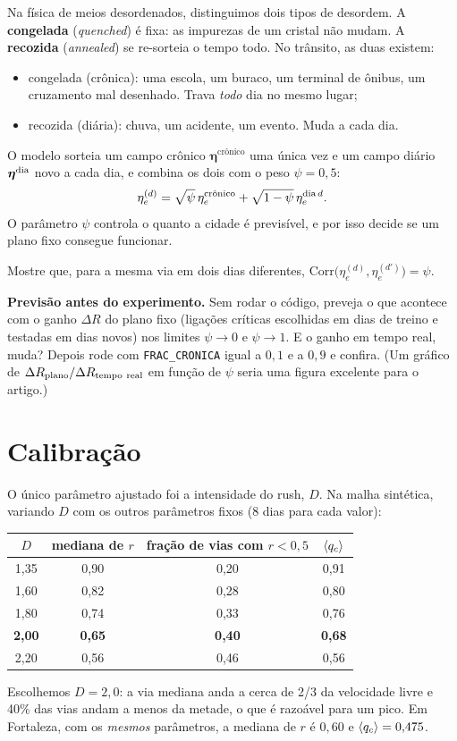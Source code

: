 \documentclass[11pt]{article}
\begin{document}
Na física de meios desordenados, distinguimos dois tipos de desordem. A \textbf{congelada} (\emph{quenched}) é fixa: as impurezas de um cristal não mudam. A \textbf{recozida} (\emph{annealed}) se re-sorteia o tempo todo. No trânsito, as duas existem:
\begin{itemize}
  \item congelada (crônica): uma escola, um buraco, um terminal de ônibus, um cruzamento mal desenhado. Trava \emph{todo} dia no mesmo lugar;
  \item recozida (diária): chuva, um acidente, um evento. Muda a cada dia.
\end{itemize}

\begin{ideia}
O modelo sorteia um campo crônico $\bm\eta^{\text{crônico}}$ uma única vez e um campo diário $\bm\eta^{\rm dia}$ novo a cada dia, e combina os dois com o peso $\psi = 0{,}5$:
\[
\eta_e^{(d)} = \sqrt\psi\,\eta_e^{\text{crônico}}+\sqrt{1-\psi}\,\eta_e^{{\rm dia}\,d}.
\]
O parâmetro $\psi$ controla o quanto a cidade é previsível, e por isso decide se um plano fixo consegue funcionar.
\end{ideia}

 Mostre que, para a mesma via em dois dias diferentes, $\mathrm{Corr}\big(\eta_e^{(d)},\eta_e^{(d')}\big) = \psi$.

 \textbf{Previsão antes do experimento.} Sem rodar o código, preveja o que acontece com o ganho $\Delta R$ do plano fixo (ligações críticas escolhidas em dias de treino e testadas em dias novos) nos limites $\psi\to0$ e $\psi\to1$. E o ganho em tempo real, muda? Depois rode com \texttt{FRAC\_CRONICA} igual a $0{,}1$ e a $0{,}9$ e confira. (Um gráfico de $\Delta R_{\rm plano}/\Delta R_{\rm tempo\ real}$ em função de $\psi$ seria uma figura excelente para o artigo.)

\section{Calibração}

O único parâmetro ajustado foi a intensidade do rush, $D$. Na malha sintética, variando $D$ com os outros parâmetros fixos (8 dias para cada valor):
\begin{center}
\begin{tabular}{cccc}
\toprule
$D$ & mediana de $r$ & fração de vias com $r<0{,}5$ & $\left\langle q_c \right\rangle$\\
\midrule
1,35 & 0,90 & 0,20 & 0,91\\
1,60 & 0,82 & 0,28 & 0,80\\
1,80 & 0,74 & 0,33 & 0,76\\
\textbf{2,00} & \textbf{0,65} & \textbf{0,40} & \textbf{0,68}\\
2,20 & 0,56 & 0,46 & 0,56\\
\bottomrule
\end{tabular}
\end{center}
Escolhemos $D=2{,}0$: a via mediana anda a cerca de 2/3 da velocidade livre e 40\% das vias andam a menos da metade, o que é razoável para um pico. Em Fortaleza, com os \emph{mesmos} parâmetros, a mediana de $r$ é $0{,}60$ e $\left\langle q_c \right\rangle = 0{,}475$.
\end{document}
